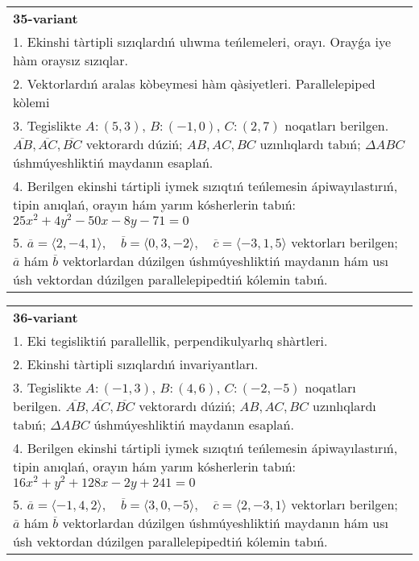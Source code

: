 \documentclass{article}
\begin{document}
\begin{tabular}{m{17cm}}
\textbf{35-variant}\\
1. Ekinshi tàrtipli sızıqlardıń ulıwma teńlemeleri, orayı. Orayǵa iye hàm oraysız sızıqlar.\\

2. Vektorlardıń aralas kòbeymesi hàm qàsiyetleri. Parallelepiped kòlemi\\

3. Tegislikte $A: (5, 3)$, $B: (-1, 0)$, $C: (2, 7)$ noqatları berilgen. $\overline{AB}, \overline{AC}, \overline{BC}$ vektorardı dúziń; $AB, AC, BC$ uzınlıqlardı tabıń; $\Delta ABC$ úshmúyeshliktiń maydanın esaplań. \\

4. Berilgen ekinshi tártipli iymek sızıqtıń teńlemesin ápiwayılastırıń, tipin anıqlań, orayın hám yarım kósherlerin tabıń: $25x^2+4y^2-50x-8y-71=0$\\

5. \(\overline{a} = \langle 2, -4, 1 \rangle, \quad \overline{b} = \langle 0, 3, -2 \rangle, \quad \overline{c} = \langle -3, 1, 5 \rangle\) vektorları berilgen; \(\overline{a}\) hám \(\overline{b}\) vektorlardan dúzilgen úshmúyeshliktiń maydanın hám usı úsh vektordan dúzilgen parallelepipedtiń kólemin tabıń.
\end{tabular}
\vspace{1cm}


\begin{tabular}{m{17cm}}
\textbf{36-variant}\\
1. Eki tegisliktiń parallellik, perpendikulyarlıq shàrtleri.\\

2. Ekinshi tàrtipli sızıqlardıń invariyantları.\\

3. Tegislikte $A: (-1, 3)$, $B: (4, 6)$, $C: (-2, -5)$ noqatları berilgen. $\overline{AB}, \overline{AC}, \overline{BC}$ vektorardı dúziń; $AB, AC, BC$ uzınlıqlardı tabıń; $\Delta ABC$ úshmúyeshliktiń maydanın esaplań. \\

4. Berilgen ekinshi tártipli iymek sızıqtıń teńlemesin ápiwayılastırıń, tipin anıqlań, orayın hám yarım kósherlerin tabıń: $16x^2+y^2+128x-2y+241=0$\\

5. \(\overline{a} = \langle -1, 4, 2 \rangle, \quad \overline{b} = \langle 3, 0, -5 \rangle, \quad \overline{c} = \langle 2, -3, 1 \rangle\) vektorları berilgen; \(\overline{a}\) hám \(\overline{b}\) vektorlardan dúzilgen úshmúyeshliktiń maydanın hám usı úsh vektordan dúzilgen parallelepipedtiń kólemin tabıń.
\end{tabular}
\vspace{1cm}
\end{document}
